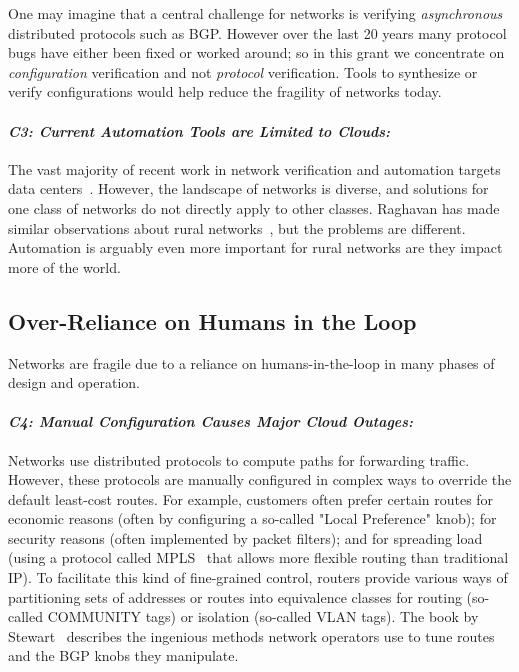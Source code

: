 One may imagine that a central challenge for networks is verifying {\em asynchronous} distributed protocols such as BGP.  However over the last 20 years many protocol bugs have either been fixed or worked around; so in this grant we concentrate on {\em configuration} verification and not {\em protocol} verification.  Tools to synthesize or verify configurations would help reduce the fragility of networks today.

\paragraph*{\em C3: Current Automation Tools are Limited to Clouds:}
%
The vast majority of recent work in network verification and automation targets data centers~\cite{hsa, surgeries, libra, DBLP:conf/popl/FosterKM0T15}. However, the landscape of networks is diverse, and solutions for one class of networks do not directly apply to other classes.   Raghavan has made similar observations about rural networks~\cite{barathwisp}, but the problems are different.  Automation is arguably even more important for rural networks are they impact more of the world.

\subsection{Over-Reliance on Humans in the Loop}
%
Networks are fragile due to a reliance on humans-in-the-loop in many phases of design and operation.

\paragraph*{\em C4: Manual Configuration Causes Major Cloud Outages:}
Networks use distributed protocols to compute paths for forwarding
traffic.  However, these protocols are manually configured in complex
ways to override the default least-cost routes.  For example,
customers often prefer certain routes for economic reasons (often by
configuring a so-called "Local Preference" knob); for security reasons
(often implemented by packet filters); and for spreading load (using a
protocol called MPLS~\cite{MPLSIna} that allows more flexible routing
than traditional IP). To facilitate this kind of fine-grained control,
routers provide various ways of partitioning sets of addresses or
routes into equivalence classes for routing (so-called COMMUNITY tags)
or isolation (so-called VLAN tags). The book by Stewart~\cite{stewart}
describes the ingenious methods network operators use to tune routes
and the BGP knobs they manipulate.

